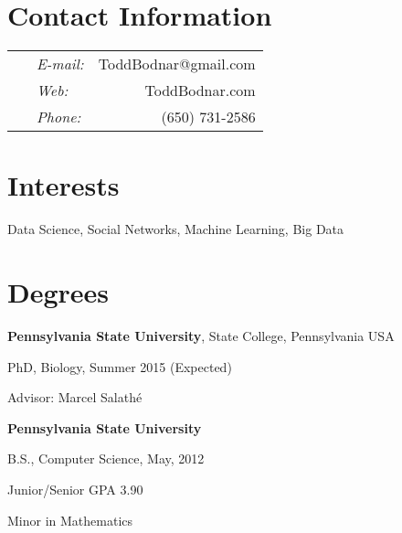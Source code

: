 \documentclass[margin,line]{res}
\newenvironment{list1}{
  \begin{list}{\ding{113}}{%
      \setlength{\itemsep}{0in}
      \setlength{\parsep}{0in} \setlength{\parskip}{0in}
      \setlength{\topsep}{0in} \setlength{\partopsep}{0in} 
      \setlength{\leftmargin}{0.17in}}}{\end{list}}
\begin{document}

\begin{resume}
\section{\sc Contact Information}
\vspace{.05in}
\begin{tabular}{@{}p{3.7in}p{.5in} r }
\   &  {\it E-mail:}  & ToddBodnar@gmail.com \\         
\   &  {\it Web:}  & ToddBodnar.com \\
\  & {\it Phone:} & (650) 731-2586 \\
\end{tabular}


\section{\sc Interests}
Data Science, Social Networks, Machine Learning, Big Data
\ \\

\section{\sc Degrees}
{\bf Pennsylvania State University}, State College, Pennsylvania USA\\
\vspace*{-.1in}
\begin{list1}
\item[] PhD, Biology, Summer 2015 (Expected)
\item[] Advisor: Marcel Salath\'e
\end{list1}



{\bf Pennsylvania State University} \\
\vspace*{-.1in}
\begin{list1}
\item[] B.S., Computer Science,  May, 2012 
\item[] Junior/Senior GPA 3.90
\item[] Minor in Mathematics
\end{list1}


\end{resume}
\end{document}
